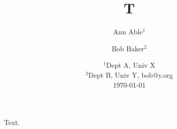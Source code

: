 \documentclass{article}
\author{Ann Able$^1$ \and Bob Baker$^2$}
\title{T}
\date{$^1$Dept A, Univ X\\ $^2$Dept B, Univ Y, bob@y.org\\ \today}
\begin{document}
\maketitle
Text.
\end{document}
